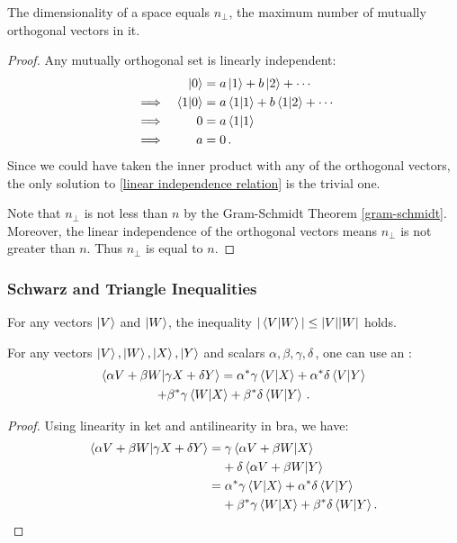 \begin{theorem}\label{n_perp dim}
The dimensionality of a space equals $n_\perp$, the maximum number of mutually orthogonal vectors in it.
\end{theorem}

\begin{proof}
Any mutually orthogonal set is linearly independent:
\begin{alignat}{3}
    &&\ket{0} &= a\ket{1} + b\ket{2} + \cdots \\
    &\implies &\braket{1}{0} &= a\braket{1} + b\braket{1}{2} + \cdots \\
    &\implies &0 &= a\braket{1} \\
   &\implies &a &= 0\,. 
\end{alignat}
Since we could have taken the inner product with any of the orthogonal vectors, the only solution to \eqref{linear independence relation} is the trivial one.

Note that $n_\perp$ is not less than $n$ by the Gram-Schmidt Theorem \eqref{gram-schmidt}. Moreover, the linear independence of the orthogonal vectors means $n_\perp$ is not greater than $n$. Thus $n_\perp$ is equal to $n$.
\end{proof}


\subsubsection{Schwarz and Triangle Inequalities}

\begin{theorem}\label{schwarz inequality}
For any vectors $\ket{V}$ and $\ket{W}$, the inequality $|\braket{V}{W}| \leq |V||W|$ holds.
\end{theorem}

\begin{lemma}
For any vectors $\ket{V}, \ket{W}, \ket{X}, \ket{Y}$ and scalars $\alpha, \beta, \gamma, \delta\,$, one can use an :
\begin{multline}
\braket{\alpha V + \beta W}{\gamma X + \delta Y} = \alpha^*\gamma \braket{V}{X} + \alpha^*\delta \braket{V}{Y} \\
+ \beta^*\gamma \braket{W}{X} + \beta^*\delta \braket{W}{Y}\,.
\end{multline}
\end{lemma}

\begin{proof}
Using linearity in ket and antilinearity in bra, we have:
\begin{align}
    \braket{\alpha V + \beta W}{\gamma X + \delta Y} &= \gamma \braket{\alpha V + \beta W}{X} \\
    &\hphantom{M} + \delta \braket{\alpha V + \beta W}{Y} \\
    &= \alpha^*\gamma \braket{V}{X} + \alpha^*\delta \braket{V}{Y} \\
    &\hphantom{M} + \beta^*\gamma \braket{W}{X} + \beta^*\delta \braket{W}{Y}.
\end{align}
\end{proof}

